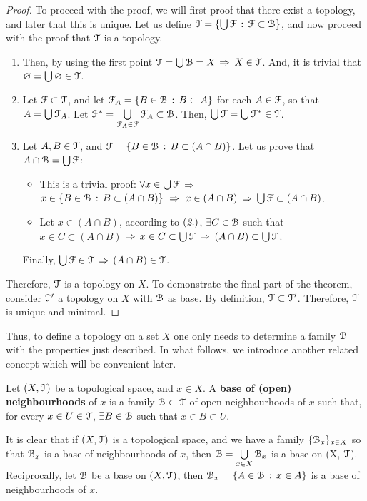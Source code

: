 \documentclass[12pt,spanish]{memoir}
\begin{document}
\begin{proof}
To proceed with the proof, we will first proof that there exist a topology, and later that this is unique.
Let us define $\EuScript{T} = \{\bigcup \EuScript{F}\,:\,\EuScript{F}\subset \EuScript{B}\}$, and now proceed with the proof that $\EuScript{T}$ is a topology.
\begin{enumerate}
\item Then, by using the first point $\EuScript{T} =\bigcup \EuScript{B}= X$ $\Rightarrow$ $X\in \EuScript{T}$. And, it is trivial that $\varnothing = \bigcup \varnothing \in \EuScript{T}$.
\item Let $\EuScript{F}\subset \EuScript{T}$, and let $\EuScript{F}_A=\{B\in \EuScript{B}\,:\, B\subset A\}$ for each $A\in\EuScript{F}$, so that $A=\bigcup\EuScript{F}_A$. Let $\EuScript{F}^*=\bigcup\limits_{\EuScript{F}_A\in\EuScript{F}}\EuScript{F}_A\subset\EuScript{B}$. Then,  $\bigcup \EuScript{F} =\bigcup\EuScript{F}^*\in\EuScript{T}$.
\item Let $A, B\in \EuScript{T}$, and $\EuScript{F} = \{B\in\EuScript{B}\,:\, B \subset(A\cap B)\}$. Let us prove that $A\cap\EuScript{B} = \bigcup\EuScript{F}$:
\begin{itemize}
\item[\boxed{\supseteq}] This is a trivial proof: $\forall x\in\bigcup\EuScript{F}$ $\Rightarrow$ $x\in\left\{B\in\EuScript{B}\,:\,B\subset(A\cap B)\right\}\ \Rightarrow\ x\in (A\cap B)$ $\Rightarrow$ $\bigcup\EuScript{F} \subset (A\cap B)$.
\item[\boxed{\subseteq}] Let $x\in (A\cap B)$, according to $(\emph{2.})$, $\exists C\in \EuScript{B}$ such that $x\in C\subset (A\cap B)$ $\Rightarrow$ $x\in C\subset \bigcup\EuScript{F}$ $\Rightarrow$ $(A\cap B)\subset \bigcup\EuScript{F}$. 
\end{itemize}
Finally, $\bigcup \EuScript{F}\in \EuScript{T}$ $\Rightarrow$ $(A\cap B) \in \EuScript{T}$.
\end{enumerate}
Therefore, $\EuScript{T}$ is a topology on $X$. To demonstrate the final part of the theorem, consider $\EuScript{T}'$ a topology on $X$ with $\EuScript{B}$ as base. By definition, $\EuScript{T}\subset \EuScript{T}'$. Therefore, $\EuScript{T}$ is unique and minimal.
\end{proof}

Thus, to define a topology on a set $X$ one only needs to determine a family $\EuScript{B}$ with the properties just described.
%
In what follows, we introduce another related concept which will be convenient later.
%
\begin{definition}
Let $(X, \EuScript{T})$ be a topological space, and $x\in X$. A \textbf{base of (open) neighbourhoods} of $x$ is a family $\EuScript{B}\subset\EuScript{T}$ of open neighbourhoods of $x$ such that, for every $x\in U\in \EuScript{T}$, $\exists B\in\EuScript{B}$ such that $x\in B\subset U$.
\label{def:base-open-neighbourhoods}
\end{definition}

It is clear that if $(X,\EuScript{T})$ is a topological space, and we have a family $\{\EuScript{B}_x\}_{x\in X}$ so that $\EuScript{B}_x$ is a base of neighbourhoods of $x$, then $\EuScript{B}=\bigcup\limits_{x\in X}\EuScript{B}_x$ is a base on (X, $\EuScript{T}$). Reciprocally, let $\EuScript{B}$ be a base on $(X, \EuScript{T})$, then $\EuScript{B}_x = \left\{A\in\EuScript{B}\,:\,x\in A\right\}$ is a base of neighbourhoods of $x$.
\end{document}

